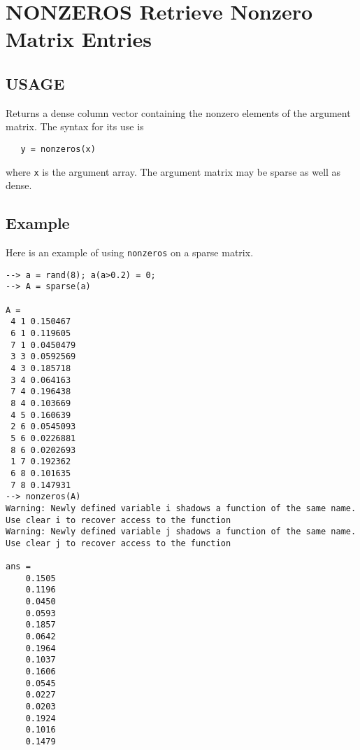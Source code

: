 \section{NONZEROS Retrieve Nonzero Matrix Entries}

\subsection{USAGE}

Returns a dense column vector containing the nonzero elements
of the argument matrix.  The syntax for its use is
\begin{verbatim}
   y = nonzeros(x)
\end{verbatim}
where \verb|x| is the argument array.  The argument matrix may
be sparse as well as dense.
\subsection{Example}

Here is an example of using \verb|nonzeros| on a sparse matrix.
\begin{verbatim}
--> a = rand(8); a(a>0.2) = 0;
--> A = sparse(a)

A = 
 4 1 0.150467
 6 1 0.119605
 7 1 0.0450479
 3 3 0.0592569
 4 3 0.185718
 3 4 0.064163
 7 4 0.196438
 8 4 0.103669
 4 5 0.160639
 2 6 0.0545093
 5 6 0.0226881
 8 6 0.0202693
 1 7 0.192362
 6 8 0.101635
 7 8 0.147931
--> nonzeros(A)
Warning: Newly defined variable i shadows a function of the same name.  Use clear i to recover access to the function
Warning: Newly defined variable j shadows a function of the same name.  Use clear j to recover access to the function

ans = 
    0.1505 
    0.1196 
    0.0450 
    0.0593 
    0.1857 
    0.0642 
    0.1964 
    0.1037 
    0.1606 
    0.0545 
    0.0227 
    0.0203 
    0.1924 
    0.1016 
    0.1479 
\end{verbatim}
